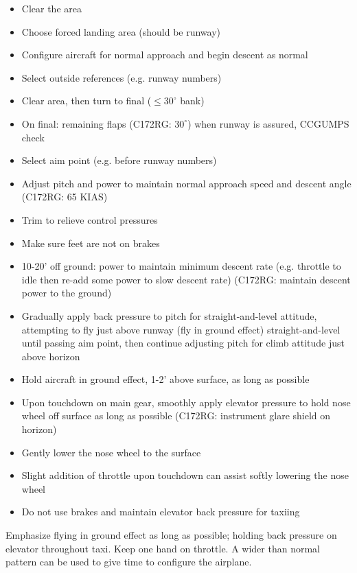 \begin{itemize}
  \item Clear the area
  \item Choose forced landing area (should be runway)
  \item Configure aircraft for normal approach and begin descent as normal
  \item Select outside references (e.g. runway numbers)
  \item Clear area, then turn to final ($\leq 30^\circ$ bank)
  \item On final: remaining flaps (C172RG: $30^\circ$) when runway is assured,
    CCGUMPS check
  \item Select aim point (e.g. before runway numbers)
  \item Adjust pitch and power to maintain normal approach speed and descent
    angle (C172RG: 65 KIAS)
  \item Trim to relieve control pressures
  \item Make sure feet are not on brakes
  \item 10-20' off ground: power to maintain minimum descent rate (e.g.
    throttle to idle then re-add some power to slow descent rate) (C172RG:
    maintain descent power to the ground)
  \item Gradually apply back pressure to pitch for straight-and-level attitude,
    attempting to fly just above runway (fly in ground effect)
    straight-and-level until passing aim point, then continue adjusting pitch
    for climb attitude just above horizon
  \item Hold aircraft in ground effect, 1-2' above surface, as long as possible
  \item Upon touchdown on main gear, smoothly apply elevator pressure to hold
    nose wheel off surface as long as possible (C172RG: instrument glare shield
    on horizon)
  \item Gently lower the nose wheel to the surface
  \item Slight addition of throttle upon touchdown can assist softly lowering
    the nose wheel
  \item Do not use brakes and maintain elevator back pressure for taxiing
\end{itemize}

Emphasize flying in ground effect as long as possible; holding back pressure on
elevator throughout taxi. Keep one hand on throttle. A wider than normal
pattern can be used to give time to configure the airplane.

